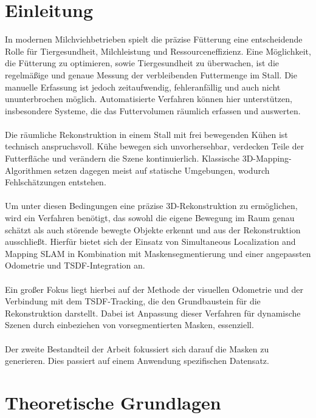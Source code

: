 \documentclass[12pt,DIV=15,BCOR=15mm,twoside,headsepline,abstract=true,listof=totoc,bibliography=totoc]{scrreprt}
\theoremstyle{remark}    %
\begin{document}
    \chapter{Einleitung}
    In modernen Milchviehbetrieben spielt die präzise Fütterung eine entscheidende Rolle für Tiergesundheit, Milchleistung und Ressourceneffizienz. Eine Möglichkeit, 
    die Fütterung zu optimieren, sowie Tiergesundheit zu überwachen, ist die regelmäßige und genaue Messung der verbleibenden Futtermenge im Stall.
    Die manuelle Erfassung ist jedoch zeitaufwendig, fehleranfällig und auch nicht ununterbrochen möglich. Automatisierte Verfahren können hier unterstützen, insbesondere 
    Systeme, die das Futtervolumen räumlich erfassen und auswerten.\\\\
    Die räumliche Rekonstruktion in einem Stall mit frei bewegenden Kühen ist technisch anspruchsvoll. Kühe bewegen sich unvorhersehbar, verdecken Teile der Futterfläche 
    und verändern die Szene kontinuierlich. Klassische 3D-Mapping-Algorithmen setzen dagegen meist auf statische Umgebungen, wodurch Fehlschätzungen entstehen.\\\\
    Um unter diesen Bedingungen eine präzise 3D-Rekonstruktion zu ermöglichen, wird ein Verfahren benötigt, das sowohl die eigene Bewegung im Raum genau schätzt als 
    auch störende bewegte Objekte erkennt und aus der Rekonstruktion ausschließt. Hierfür bietet sich der Einsatz von Simultaneous Localization and Mapping \ac{SLAM} 
    in Kombination mit Maskensegmentierung und einer angepassten Odometrie und \ac{TSDF}-Integration an.\\\\
    Ein großer Fokus liegt hierbei auf der Methode der visuellen Odometrie und der Verbindung mit dem \ac{TSDF}-Tracking, die den Grundbaustein für die Rekonstruktion
    darstellt. Dabei ist Anpassung dieser Verfahren für dynamische Szenen durch einbeziehen von vorsegmentierten Masken, essenziell.\\\\
    Der zweite Bestandteil der Arbeit fokussiert sich darauf die Masken zu generieren. Dies passiert auf einem Anwendung spezifischen Datensatz.

    \chapter{Theoretische Grundlagen}
    \label{kap:theo}
\end{document}
